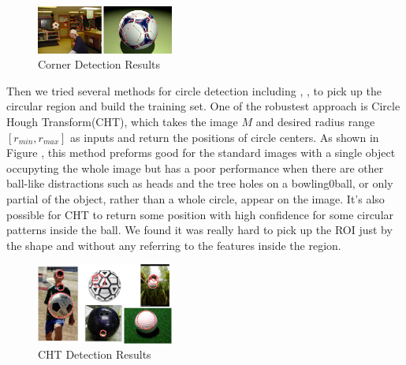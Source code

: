 \documentclass{article}
\begin{document}
\begin{figure}[htp]
\centering
	\includegraphics[width=0.4\textwidth]{CornerDetection.jpg}
\caption{Corner Detection Results}
\label{fig:crd}
\end{figure}

Then we tried several methods for circle detection including \cite{cirDetect1}, \cite{cirDetect2}, \cite{cirDetect3} to pick up the circular region and build the training set. One of the robustest approach is Circle Hough Transform(CHT), which takes the image $M$ and desired radius range $[r_{min},r_{max}]$ as inputs and return the positions of circle centers. As shown in Figure \cite{cird}, this method preforms good for the standard images with a single object occupyting the whole image but has a poor performance when there are other ball-like distractions such as heads and the tree holes on a bowling0ball, or only partial of the object, rather than a whole circle, appear on the image. It's also possible for CHT to return some position with high confidence for some circular patterns inside the ball. We found it was really hard to pick up the ROI just by the shape and without any referring to the features inside the region. \\

\begin{figure}[htp]
\centering
\includegraphics[width=0.4\textwidth]{circleDetection.jpg}
\caption{CHT Detection Results}
\label{fig:cird}
\end{figure}
\end{document}
